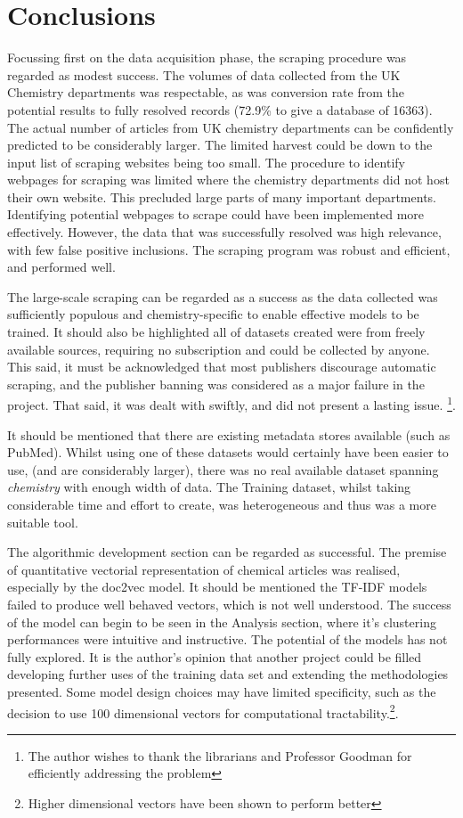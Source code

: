 \chapter{Conclusions}
Focussing first on the data acquisition phase, the scraping procedure was regarded as modest success. The volumes of data collected from the UK Chemistry departments was respectable, as was conversion rate from the potential results to fully resolved records (72.9\%  to give a database of 16363). The actual number of articles from UK chemistry departments can be confidently predicted to be considerably larger. The limited harvest could be down to the input list of scraping websites being too small. The procedure to identify webpages for scraping was limited where the chemistry departments did not host their own website. This  precluded large parts of many important departments. Identifying potential webpages to scrape could have been implemented more effectively.  However, the data that was successfully resolved was high relevance, with few false positive inclusions. The scraping program was robust and efficient, and performed well. 

The large-scale scraping can be regarded as a success as the data collected was sufficiently populous and chemistry-specific  to enable effective models to be trained. It should also be highlighted all of datasets created were from freely available sources, requiring no subscription and could be collected by anyone. This said, it must be acknowledged that most publishers discourage automatic scraping, and the publisher banning was considered as a major failure in the project. That said, it was dealt with swiftly, and did not present a lasting issue. \footnote{The author wishes to thank the librarians and Professor Goodman for efficiently addressing the problem}.

 It should be mentioned that there are existing metadata stores available (such as PubMed). Whilst using one of these datasets would certainly have been easier to use, (and  are considerably larger), there was no real available dataset spanning \emph{chemistry} with enough width of data. The Training dataset, whilst taking considerable time and effort to create, was heterogeneous and thus was a more suitable tool.

The algorithmic development section can be regarded as successful. The premise of quantitative vectorial representation of chemical articles was realised, especially by the doc2vec model. It should be mentioned the TF-IDF models failed to produce well behaved vectors, which is not well understood. The success of the model can begin to be seen in the Analysis section, where it's clustering performances were intuitive and instructive. The potential of the models has not fully explored. It is the author's opinion that another project could be filled developing further uses of the training data set and extending the methodologies presented. 
Some model design choices may have limited specificity, such as the decision to use 100 dimensional vectors for computational tractability.\footnote{Higher dimensional vectors have been shown to perform better}.

